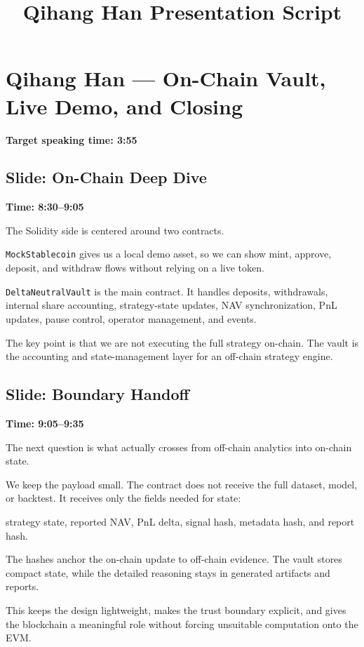 \documentclass[11pt]{article}
\title{Qihang Han Presentation Script}
\author{}
\date{}
\begin{document}
\maketitle

\section*{Qihang Han --- On-Chain Vault, Live Demo, and Closing}
\textbf{Target speaking time: 3:55}

\subsection*{Slide: On-Chain Deep Dive}
\textbf{Time: 8:30--9:05}

The Solidity side is centered around two contracts.

\texttt{MockStablecoin} gives us a local demo asset, so we can show mint, approve, deposit, and withdraw flows without relying on a live token.

\texttt{DeltaNeutralVault} is the main contract. It handles deposits, withdrawals, internal share accounting, strategy-state updates, NAV synchronization, PnL updates, pause control, operator management, and events.

The key point is that we are not executing the full strategy on-chain. The vault is the accounting and state-management layer for an off-chain strategy engine.

\subsection*{Slide: Boundary Handoff}
\textbf{Time: 9:05--9:35}

The next question is what actually crosses from off-chain analytics into on-chain state.

We keep the payload small. The contract does not receive the full dataset, model, or backtest. It receives only the fields needed for state:

strategy state, reported NAV, PnL delta, signal hash, metadata hash, and report hash.

The hashes anchor the on-chain update to off-chain evidence. The vault stores compact state, while the detailed reasoning stays in generated artifacts and reports.

This keeps the design lightweight, makes the trust boundary explicit, and gives the blockchain a meaningful role without forcing unsuitable computation onto the EVM.
\end{document}

